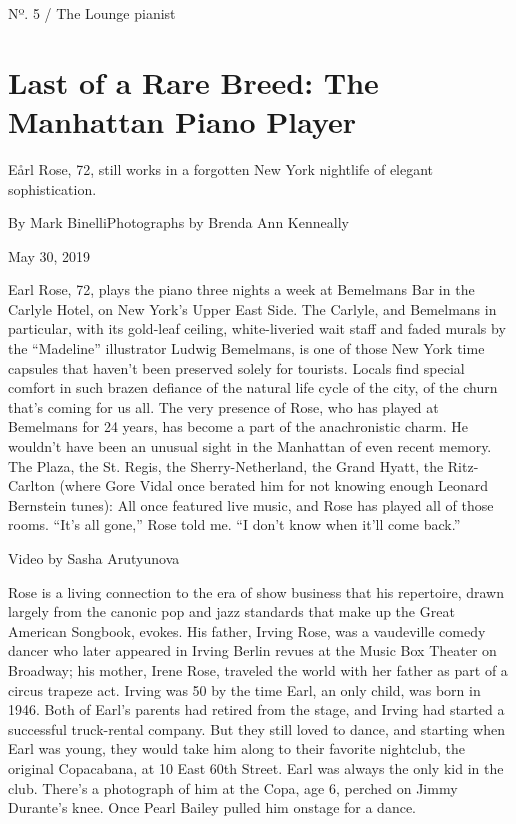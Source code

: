 Nº. 5 / The Lounge pianist

\hypertarget{last-of-a-rare-breed-the-manhattan-piano-player-1}{%
\section{Last of a Rare Breed: The Manhattan Piano
Player}\label{last-of-a-rare-breed-the-manhattan-piano-player-1}}

Eårl Rose, 72, still works in a forgotten New York nightlife of elegant
sophistication.

By Mark BinelliPhotographs by Brenda Ann Kenneally

May 30, 2019

Earl Rose, 72, plays the piano three nights a week at Bemelmans Bar in
the Carlyle Hotel, on New York's Upper East Side. The Carlyle, and
Bemelmans in particular, with its gold-leaf ceiling, white-liveried wait
staff and faded murals by the ``Madeline'' illustrator Ludwig Bemelmans,
is one of those New York time capsules that haven't been preserved
solely for tourists. Locals find special comfort in such brazen defiance
of the natural life cycle of the city, of the churn that's coming for us
all. The very presence of Rose, who has played at Bemelmans for 24
years, has become a part of the anachronistic charm. He wouldn't have
been an unusual sight in the Manhattan of even recent memory. The Plaza,
the St. Regis, the Sherry-Netherland, the Grand Hyatt, the Ritz-Carlton
(where Gore Vidal once berated him for not knowing enough Leonard
Bernstein tunes): All once featured live music, and Rose has played all
of those rooms. ``It's all gone,'' Rose told me. ``I don't know when
it'll come back.''

 Video by Sasha Arutyunova

Rose is a living connection to the era of show business that his
repertoire, drawn largely from the canonic pop and jazz standards that
make up the Great American Songbook, evokes. His father, Irving Rose,
was a vaudeville comedy dancer who later appeared in Irving Berlin
revues at the Music Box Theater on Broadway; his mother, Irene Rose,
traveled the world with her father as part of a circus trapeze act.
Irving was 50 by the time Earl, an only child, was born in 1946. Both of
Earl's parents had retired from the stage, and Irving had started a
successful truck-rental company. But they still loved to dance, and
starting when Earl was young, they would take him along to their
favorite nightclub, the original Copacabana, at 10 East 60th Street.
Earl was always the only kid in the club. There's a photograph of him at
the Copa, age 6, perched on Jimmy Durante's knee. Once Pearl Bailey
pulled him onstage for a dance.

